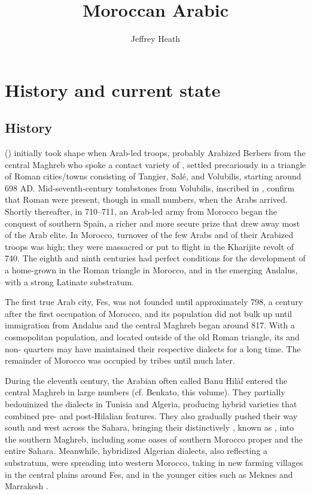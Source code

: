 \documentclass[output=paper]{langsci/langscibook}
\title{Moroccan Arabic}
\author{Jeffrey Heath\affiliation{University of Michigan}}
\begin{document}
\section{History and current state}

\subsection{History}

 () initially took shape when Arab-led troops, probably Arabized Berbers from the central Maghreb who spoke a contact variety of , settled precariously in a triangle of Roman cities/towns consisting of Tangier, Salé, and Volubilis, starting around 698 AD. Mid-seventh-century tombstones from Volubilis, inscribed in , confirm that Roman  were present, though in small numbers, when the Arabs arrived. Shortly thereafter, in 710–711, an Arab-led army from Morocco began the conquest of southern Spain, a richer and more secure prize that drew away most of the Arab elite. In Morocco, turnover of the few Arabs and of their Arabized  troops was high; they were massacred or put to flight in the Kharijite revolt of 740. The eighth and ninth centuries had perfect conditions for the development of a home-grown  in the Roman triangle in Morocco, and in the emerging Andalus, with a strong Latinate substratum.  

The first true Arab city, Fes, was not founded until approximately 798, a century after the first occupation of Morocco, and its population did not bulk up until immigration from Andalus and the central Maghreb began around 817. With a cosmopolitan population, and located outside of the old Roman triangle, its  and non- quarters may have maintained their respective dialects for a long time. The remainder of Morocco was occupied by  tribes until much later.

During the eleventh century, the Arabian  often called Banu Hilāl entered the central Maghreb in large numbers (cf. Benkato, this volume). They partially bedouinized the  dialects in Tunisia and Algeria, producing hybrid varieties that combined pre- and post-Hilalian features. They also gradually pushed their way south and west across the Sahara, bringing their distinctively  , known as , into the southern Maghreb, including some oases of southern Morocco proper and the entire  Sahara. Meanwhile, hybridized Algerian dialects, also reflecting a  substratum, were spreading into western Morocco, taking  in new farming villages in the central plains around Fes, and in the younger cities such as Meknes and Marrakesh \citep{Heath2002}.
\end{document}
